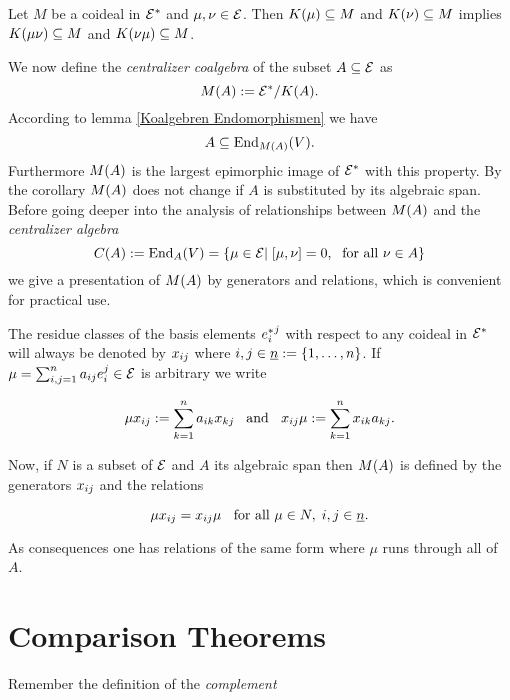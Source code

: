 \documentclass[twoside,12pt]{article}
\begin{document}
\begin{cor} \label{Verknupfungstreue}
Let $M$ be a coideal in ${{\cal E}}^*$ and $\mu , \nu \in {\cal E}$. Then
$K(\mu)  \subseteq M$ and $K(\nu) \subseteq M$ implies
$K(\mu \nu) \subseteq M$ and $K(\nu\mu ) \subseteq M$.
\end{cor}

We now define the {\em centralizer coalgebra} of the subset
$A\subseteq{\cal E}$ as
\[M(A):={{\cal E}}^* / K(A).\] 
According to
lemma
\ref{Koalgebren Endomorphismen} we have
\[A \subseteq {\rm End}_{M(A)}{(V)}.\]
Furthermore $M(A)$ is the largest epimorphic image of ${{\cal E}}^*$ with this
property. By the corollary $M(A)$ does not change if $A$ is substituted
by its algebraic span. Before going deeper into the analysis of
relationships between $M(A)$ and the {\em centralizer algebra}
\[ C(A):={\rm End}_{A}{(V)}=\{ \mu \in {\cal E}|\; [\mu , \nu]=0, \;\mbox{ for
all } \nu \in A\} \]
we give a presentation of $M(A)$ by generators and relations, which is
convenient for practical use.\Ab

The residue classes of the
basis elements ${{e}^*_{i}}^{j}$ with respect to any coideal in ${{\cal E}}^*$ will
always be denoted by $x_{i j}$ where $i,j\in \underline{n}:=\{1, \ldots , n\}$. 
If 
$\mu =\sum_{i,j=1}^n a_{ij}e_{i}^{ j}\in {\cal E}$ is arbitrary we write 

\begin{equation}\label{Notation End}
\mu x_{i j} :=\sum_{k=1}^n a_{ik}x_{kj \;} \; \mbox{ and } \; \;
x_{i j}\mu :=\sum_{k=1}^n x_{i k}a_{kj}.
\end{equation}

Now, if $N$ is a subset of ${\cal E}$ and $A$ its algebraic span
then  $M(A)$ is defined by the generators $x_{i j}$ and the relations

\begin{equation} \label{Rel MA}
\mu x_{i j} = x_{i j} \mu \; \; \mbox{ for all } \mu \in N, \;
i,j \in \underline{n}.
\end{equation}

As consequences one has relations of the same form where $\mu$ runs
through all of $A$.








\section{Comparison Theorems}

Remember the definition of the {\em complement}
\end{document}
